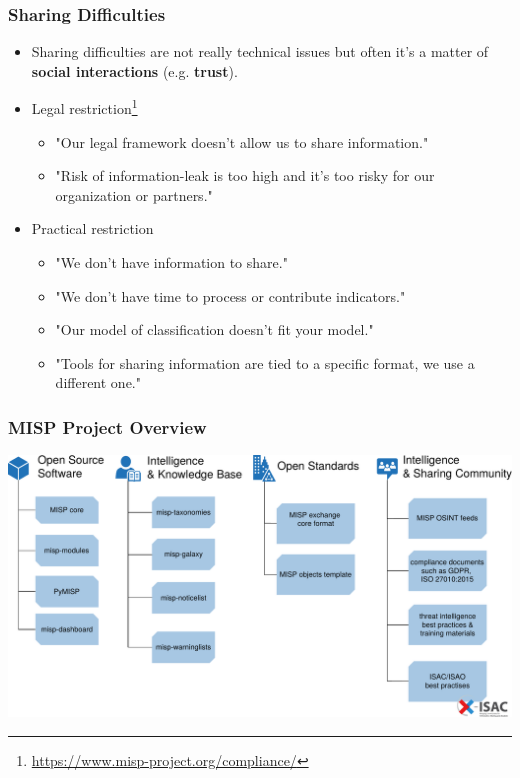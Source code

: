 \begin{frame}
\frametitle{Sharing Difficulties}
        \begin{itemize}
                \item Sharing difficulties are not really technical issues but often it's a matter of {\bf social interactions} (e.g. {\bf trust}).
                \item Legal restriction\footnote{\url{https://www.misp-project.org/compliance/}}
                        \begin{itemize}
                                \item "Our legal framework doesn't allow us to share information."
                                \item "Risk of information-leak is too high and it's too risky for our organization or partners."
                        \end{itemize}
                \item Practical restriction
                        \begin{itemize}
                                \item "We don't have information to share."
                                \item "We don't have time to process or contribute indicators."
                                \item "Our model of classification doesn't fit your model."
                                \item "Tools for sharing information are tied to a specific format, we use a different one."
                        \end{itemize}
        \end{itemize}
\end{frame}


\begin{frame}
        \frametitle{MISP Project Overview}
        \includegraphics[scale=0.35]{misp-overview-simplified.pdf}
\end{frame}

